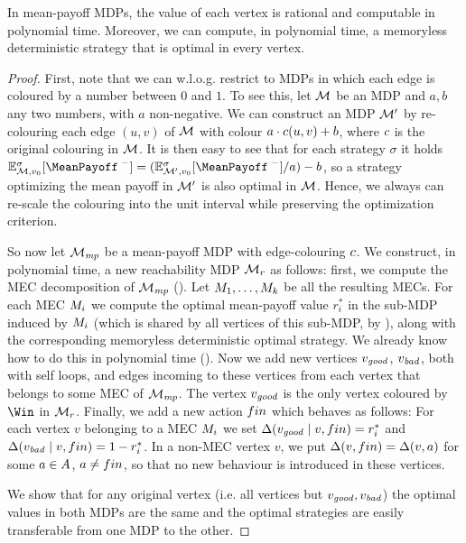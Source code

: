 \begin{theorem}
\label{5-thm:general-mp-main}
	In mean-payoff MDPs, the value of each vertex is rational and computable in polynomial time. Moreover, we can compute, in polynomial time, a memoryless deterministic strategy that is optimal in every vertex.
\end{theorem}
\begin{proof}
First, note that we can w.l.o.g. restrict to MDPs in which each edge is coloured by a number between $0$ and $ 1 $. To see this, let $\mathcal{M}$ be an MDP and $a,b$ any two numbers, with $a$ non-negative. We can construct an MDP $\mathcal{M}'$ by re-colouring each edge $(u,v)$ of $\mathcal{M}$ with colour $a\cdot c(u,v)+b$, where $c$ is the original colouring in $\mathcal{M}$. It is then easy to see that for each strategy $\sigma$ it holds $\expv_{\mdp,\vinit}^\sigma[\MeanPayoffInf]=(\expv_{\mdp',\vinit}^\sigma[\MeanPayoffInf]/a)-b$, so a strategy optimizing the mean payoff in $\mathcal{M}'$ is also optimal in $\mathcal{M}$. Hence, we always can re-scale the colouring into the unit interval while preserving the optimization criterion.

So now let $\mathcal{M}_{\mathit{mp}}$ be a mean-payoff MDP with edge-colouring $c$. We construct, in polynomial time, a new reachability MDP $\mathcal{M}_r$ as follows: first, we compute the MEC decomposition of $\mathcal{M}_{\mathit{mp}}$ (). Let $M_1,\dots,M_k$ be all the resulting MECs. For each MEC $M_i$ we compute the optimal mean-payoff value $r_i^*$ in the sub-MDP induced by $M_i$ (which is shared by all vertices of this sub-MDP, by ), along with the corresponding memoryless deterministic optimal strategy. We already know how to do this in polynomial time (). Now we add new vertices $v_{\mathit{good}}$, $v_{\mathit{bad}}$, both with self loops, and edges incoming to these vertices from each vertex that belongs to some MEC of $\mathcal{M}_{\mathit{mp}}$. The vertex $v_{\mathit{good}}$ is the only vertex coloured by $\Win$ in $\mathcal{M}_r$. Finally, we add a new action $fin$ which behaves as follows: For each vertex $v$ belonging to a MEC $M_i$ we set $\Delta(v_{\mathit{good}}\mid v,fin) = r^*_i$ and $\Delta(v_{\mathit{bad}}\mid v,fin) = 1-r^*_i $. In a non-MEC vertex $ v $, we put $ \Delta(v,fin) = \Delta(v,a) $ for some $ a\in A $, $ a\neq fin $, so that no new behaviour is introduced in these vertices.

We show that for any original vertex (i.e. all vertices but $v_{\mathit{good}},v_{\mathit{bad}}$) the optimal values in both MDPs are the same and the optimal strategies are easily transferable from one MDP to the other.


\end{proof}
